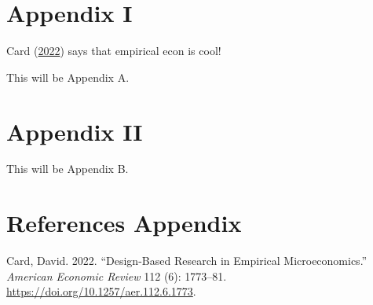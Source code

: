 \documentclass[
  12pt,
]{article}
\newlength{\cslhangindent}
\newlength{\cslentryspacingunit} %
\newenvironment{CSLReferences}[2] %
 {%
  \setlength{\parindent}{0pt}
  \ifodd #1
  \let\oldpar\par
  \def\par{\hangindent=\cslhangindent\oldpar}
  \fi
  \setlength{\parskip}{#2\cslentryspacingunit}
 }%
 {}
\begin{document}
\newpage

\hypertarget{appendix-appendix}{%
\appendix}


\hypertarget{app_a}{%
\section{Appendix I}\label{app_a}}

Card (\protect\hyperlink{ref-card_design-based_2022}{2022}) says that empirical econ is cool!

This will be Appendix A.

\hypertarget{app_b}{%
\section{Appendix II}\label{app_b}}

This will be Appendix B.

\hypertarget{references-appendix}{%
\section*{References Appendix}\label{references-appendix}}

\hypertarget{refs_appendix}{}
\begin{CSLReferences}{1}{0}
\leavevmode{}%
Card, David. 2022. {``Design-{Based} {Research} in {Empirical} {Microeconomics}.''} \emph{American Economic Review} 112 (6): 1773--81. \url{https://doi.org/10.1257/aer.112.6.1773}.

\end{CSLReferences}
\end{document}
